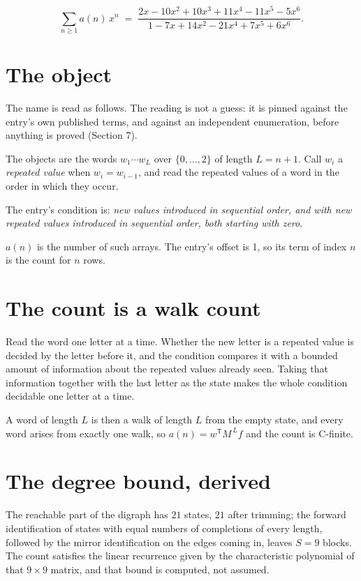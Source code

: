 \documentclass[11pt]{article}
\theoremstyle{definition}
\begin{document}
\[\sum_{n \ge 1} a(n)\,x^n \;=\; \frac{2x - 10x^{2} + 10x^{3} + 11x^{4} - 11x^{5} - 5x^{6}}{1 - 7x + 14x^{2} - 21x^{4} + 7x^{5} + 6x^{6}}.\]

\section{The object}

The name is read as follows. The reading is not a guess: it is pinned against the entry's own published terms, and against an independent enumeration, before anything is proved (Section 7).

The objects are the words $w_1\cdots w_L$ over $\{0,\dots,2\}$ of length $L = n + 1$. Call $w_i$ a {\itshape repeated value} when $w_i = w_{i-1}$, and read the repeated values of a word in the order in which they occur.

The entry's condition is: {\itshape new values introduced in sequential order, and with new repeated values introduced in sequential order, both starting with zero}.

$a(n)$ is the number of such arrays. The entry's offset is 1, so its term of index $n$ is the count for $n$ rows.

\section{The count is a walk count}

Read the word one letter at a time. Whether the new letter is a repeated value is decided by the letter before it, and the condition compares it with a bounded amount of information about the repeated values already seen. Taking that information together with the last letter as the state makes the whole condition decidable one letter at a time.

A word of length $L$ is then a walk of length $L$ from the empty state, and every word arises from exactly one walk, so $a(n) = w^{\mathsf T}M^{\,L}f$ and the count is C-finite.

\section{The degree bound, derived}

The reachable part of the digraph has $21$ states, $21$ after trimming; the forward identification of states with equal numbers of completions of every length, followed by the mirror identification on the edges coming in, leaves $S = 9$ blocks. The count satisfies the linear recurrence given by the characteristic polynomial of that $9\times9$ matrix, and that bound is computed, not assumed.
\end{document}
